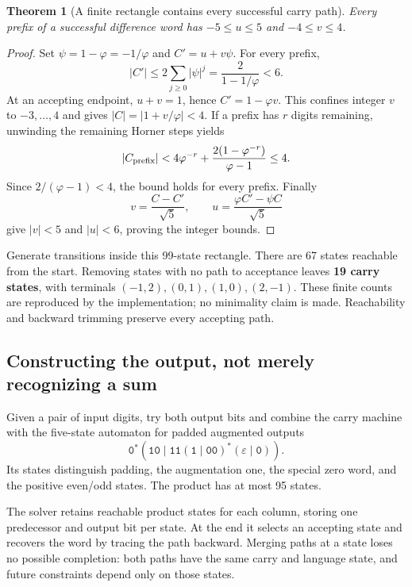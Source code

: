 \documentclass[11pt]{article}
\newtheorem{theorem}{Theorem}[section]
\theoremstyle{definition}\newtheorem{definition}[theorem]{Definition}
\newcommand{\ph}{\varphi}
\begin{document}
\begin{theorem}[A finite rectangle contains every successful carry path]
Every prefix of a successful difference word has
$-5\le u\le5$ and $-4\le v\le4$.
\end{theorem}
\begin{proof}
Set $\psi=1-\ph=-1/\ph$ and $C'=u+v\psi$. For every prefix,
\[
|C'|\le 2\sum_{j\ge0}|\psi|^j=\frac{2}{1-1/\ph}<6.
\]
At an accepting endpoint, $u+v=1$, hence $C'=1-\ph v$.
This confines integer $v$ to $-3,\ldots,4$ and gives
$|C|=|1+v/\ph|<4$. If a prefix has $r$ digits remaining, unwinding the
remaining Horner steps yields
\[
|C_{\rm prefix}|<4\ph^{-r}
 +\frac{2(1-\ph^{-r})}{\ph-1}\le4.
\]
Since $2/(\ph-1)<4$, the bound holds for every prefix. Finally
\[
v=\frac{C-C'}{\sqrt5},\qquad
u=\frac{\ph C'-\psi C}{\sqrt5}
\]
give $|v|<5$ and $|u|<6$, proving the integer bounds.
\end{proof}
Generate transitions inside this 99-state rectangle. There are 67 states
reachable from the start. Removing states with no path to acceptance
leaves \textbf{19 carry states}, with terminals
$(-1,2),(0,1),(1,0),(2,-1)$. These finite counts are reproduced by the
implementation; no minimality claim is made. Reachability and backward
trimming preserve every accepting path.

\subsection{Constructing the output, not merely recognizing a sum}
Given a pair of input digits, try both output bits and combine the carry
machine with the five-state automaton for padded augmented outputs
\[
\texttt{0}^*(\texttt{10}\mid
\texttt{11}(\texttt{1}\mid\texttt{00})^*(\varepsilon\mid\texttt{0})).
\]
Its states distinguish padding, the augmentation one, the special zero
word, and the positive even/odd states. The product has at most 95 states.

The solver retains reachable product states for each column, storing one
predecessor and output bit per state. At the end it selects an accepting
state and recovers the word by tracing the path backward. Merging paths
at a state loses no possible completion: both paths have the same carry
and language state, and future constraints depend only on those states.
\end{document}
